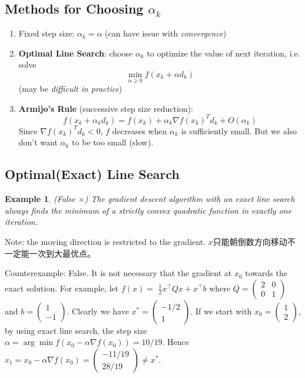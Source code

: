 \documentclass[11pt,a4paper]{article}
\newtheorem{example}{Example}
\begin{document}
\subsection{Methods for Choosing $\alpha_k$}
\begin{enumerate}[Method (1):]
    \item Fixed step size: $\alpha_k=\alpha$ (can have issue with \textit{convergence})
    \item \textbf{Optimal Line Search}: choose $\alpha_k$ to optimize the value of next iteration, i.e. solve $$\min_{\alpha\geq 0}f(x_k+\alpha d_k)$$ (may be \textit{difficult in practice})
    \item \textbf{Armijo's Rule} (successive step size reduction):$$f(x_k+\alpha_k d_k)=f(x_k)+\alpha_k \nabla f(x_k)^T d_k+O(\alpha_k)$$
    Since $\nabla f(x_k)^T d_k<0$, $f$ decreases when $\alpha_k$ is sufficiently small. But we also don't want $\alpha_k$ to be too small (slow).
\end{enumerate}

\subsection{Optimal(Exact) Line Search}
\begin{example}
    (False $\times$) The gradient descent algorithm with an exact line search always finds the minimum of a strictly convex quadratic function in exactly one iteration.
\end{example}
Note: the moving direction is restricted to the gradient. $x$只能朝倒数方向移动不一定能一次到大最优点。

Counterexample: False. It is not necessary that the gradient at $x_{0}$ towards the exact solution. For example, let $f(x)=$ $\frac{1}{2} x^{\top} Q x+x^{\top} b$ where $Q=\left(\begin{array}{ll}2 & 0 \\ 0 & 1\end{array}\right)$ and $b=\left(\begin{array}{c}1 \\ -1\end{array}\right)$. Clearly we have $x^{*}=\left(\begin{array}{c}-1 / 2 \\ 1\end{array}\right)$. If we start with $x_{0}=\left(\begin{array}{l}1 \\ 2\end{array}\right)$, by using exact line search, the step size $\alpha=\arg \min f\left(x_{0}-\alpha \nabla f\left(x_{0}\right)\right)=10 / 19$. Hence $x_{1}=x_{0}-\alpha \nabla f\left(x_{0}\right)=\left(\begin{array}{c}-11 / 19 \\ 28 / 19\end{array}\right) \neq x^{*}$.
\end{document}
